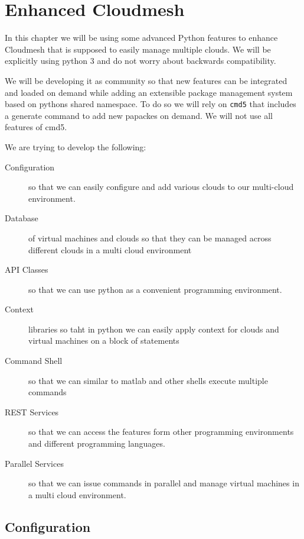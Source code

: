 \chapter{Enhanced Cloudmesh}

In this chapter we will be using some advanced Python features to
enhance Cloudmesh that is supposed to easily manage multiple
clouds. We will be explicitly using python 3 and do
not worry about backwards compatibility.

We will be developing it as community so that new features can be
integrated and loaded on demand while adding an extensible package
management system based on pythons shared namespace. To do so we will
rely on \verb|cmd5| that includes a generate command to add new
papackes on demand. We will not use all features of cmd5.

We are trying to develop the following:

\begin{description}

\item[Configuration] so that we can easily configure and add various
  clouds to our multi-cloud environment.

\item[Database] of virtual machines and clouds so that they can be
  managed across different clouds in a multi cloud environment

\item[API Classes] so that we can use python as a convenient
  programming environment.

\item[Context] libraries so taht in python we can easily apply context
  for clouds and virtual machines on a block of statements

\item[Command Shell] so that we can similar to matlab
  and other shells execute multiple commands

\item[REST Services]  so that we can access the features
form other programming environments and different programming
languages.

\item[Parallel Services] so that we can issue commands in parallel and
  manage virtual machines in a multi cloud environment.

\end{description}



\section{Configuration}

